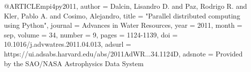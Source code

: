 
@ARTICLE{mpi4py2011,
       author = {{Dalcin}, Lisandro D. and {Paz}, Rodrigo R. and {Kler}, Pablo A. and {Cosimo}, Alejandro},
        title = "{Parallel distributed computing using Python}",
      journal = {Advances in Water Resources},
         year = 2011,
        month = sep,
       volume = {34},
       number = {9},
        pages = {1124-1139},
          doi = {10.1016/j.advwatres.2011.04.013},
       adsurl = {https://ui.adsabs.harvard.edu/abs/2011AdWR...34.1124D},
      adsnote = {Provided by the SAO/NASA Astrophysics Data System}
}
